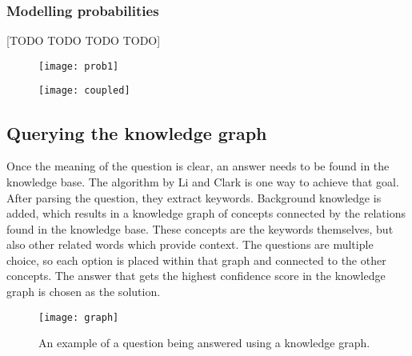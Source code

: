 \subsubsection{Modelling probabilities}
[TODO TODO TODO TODO]

\begin{figure}[h!]
\begin{center}
\texttt{[image: prob1]}
\end{center}
\label{fig:prob1}
\end{figure}

\begin{figure}[h!]
\begin{center}
\texttt{[image: coupled]}
\end{center}
\label{fig:coupled}
\end{figure}
\subsection{Querying the knowledge graph}
Once the meaning of the question is clear, an answer needs to be found in the knowledge base. The algorithm by Li and Clark \cite{sciencequestions} is one way to achieve that goal. After parsing the question, they extract keywords. Background knowledge is added, which results in a knowledge graph of concepts connected by the relations found in the knowledge base. These concepts are the keywords themselves, but also other related words which provide context. The questions are multiple choice, so each option is placed within that graph and connected to the other concepts. The answer that gets the highest confidence score in the knowledge graph is chosen as the solution.

\begin{figure}
\texttt{[image: graph]}
\caption{An example of a question being answered using a knowledge graph.}\label{fig:parsetree}
\end{figure}
